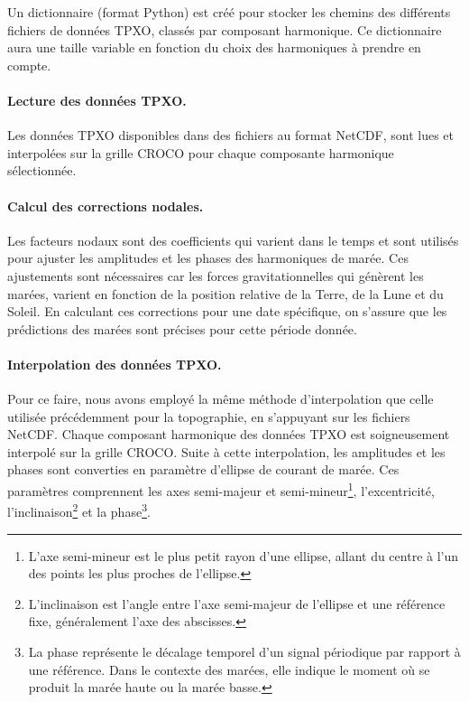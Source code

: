 Un dictionnaire (format Python) est créé pour stocker les chemins des différents fichiers de données TPXO, classés par composant harmonique. Ce dictionnaire aura une taille variable en fonction du choix des harmoniques à prendre en compte.

\paragraph{Lecture des données TPXO.\\}

Les données TPXO disponibles dans des fichiers au format NetCDF, sont lues et interpolées sur la grille CROCO pour chaque composante harmonique sélectionnée.

\paragraph{Calcul des corrections nodales.\\}

Les facteurs nodaux sont des coefficients qui varient dans le temps et sont utilisés pour ajuster les amplitudes et les phases des harmoniques de marée. Ces ajustements sont nécessaires car les forces gravitationnelles qui génèrent les marées, varient en fonction de la position relative de la Terre, de la Lune et du Soleil. En calculant ces corrections pour une date spécifique, on s'assure que les prédictions des marées sont précises pour cette période donnée.

\paragraph{Interpolation des données TPXO.\\}

Pour ce faire, nous avons employé la même méthode d'interpolation que celle utilisée précédemment pour la topographie, en s'appuyant sur les fichiers NetCDF. Chaque composant harmonique des données TPXO est soigneusement interpolé sur la grille CROCO. Suite à cette interpolation, les amplitudes et les phases sont converties en paramètre d'ellipse de courant de marée. Ces paramètres comprennent les axes semi-majeur et semi-mineur\footnote{L'axe semi-mineur est le plus petit rayon d'une ellipse, allant du centre à l'un des points les plus proches de l'ellipse.}, l'excentricité, l'inclinaison\footnote{L'inclinaison est l'angle entre l'axe semi-majeur de l'ellipse et une référence fixe, généralement l'axe des abscisses.} et la phase\footnote{La phase représente le décalage temporel d'un signal périodique par rapport à une référence. Dans le contexte des marées, elle indique le moment où se produit la marée haute ou la marée basse.}.


